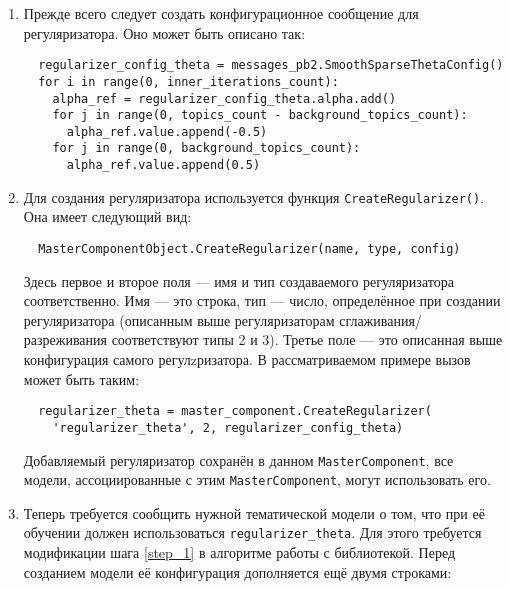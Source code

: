 \begin{enumerate}
	\item Прежде всего следует создать конфигурационное сообщение для регуляризатора. Оно может быть описано так:
	
	\vspace{4pt}
        \verb|  regularizer_config_theta = messages_pb2.SmoothSparseThetaConfig()| \\
        \verb|  for i in range(0, inner_iterations_count):| \\
        \verb|    alpha_ref = regularizer_config_theta.alpha.add()| \\
        \verb|    for j in range(0, topics_count - background_topics_count):| \\
        \verb|      alpha_ref.value.append(-0.5)| \\
        \verb|    for j in range(0, background_topics_count):| \\
        \verb|      alpha_ref.value.append(0.5)|
	\vspace{4pt}
	
	\item Для создания регуляризатора используется функция \verb|CreateRegularizer()|. Она имеет следующий вид:
	
	\vspace{4pt}	
	\verb|  MasterComponentObject.CreateRegularizer(name, type, config)|
	\vspace{4pt}	
	
	Здесь первое и второе поля --- имя и тип создаваемого регуляризатора соответственно. Имя --- это строка, тип --- число, определённое при создании регуляризатора (описанным выше регуляризаторам сглаживания/разреживания соответствуют типы 2 и 3). Третье поле --- это описанная выше конфигурация самого регулzризатора. В рассматриваемом примере вызов может быть таким:
	
	\vspace{4pt}	
	\verb|  regularizer_theta = master_component.CreateRegularizer(| \\
	\verb|    'regularizer_theta', 2, regularizer_config_theta)|
	\vspace{4pt}	
	
	Добавляемый регуляризатор сохранён в данном \verb|MasterComponent|, все модели, ассоциированные с этим \verb|MasterComponent|, могут использовать его.	
	
	\item Теперь требуется сообщить нужной тематической модели о том, что при её обучении должен использоваться \verb|regularizer_theta|. Для этого требуется модификации шага \ref{step_1} в алгоритме работы с библиотекой. Перед созданием модели её конфигурация дополняется ещё двумя строками:
	

\end{enumerate}

